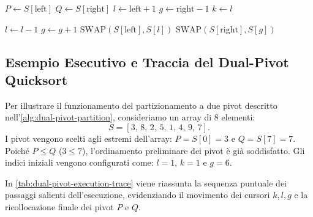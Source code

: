 \begin{algorithm}[H]
\caption{Dual-Pivot Partitioning (Yaroslavskiy)}
\label{alg:dual-pivot-partition}

$P \leftarrow S[\text{left}]$\;
$Q \leftarrow S[\text{right}]$\;
$l \leftarrow \text{left} + 1$\;
$g \leftarrow \text{right} - 1$\;
$k \leftarrow l$\;

$l \leftarrow l - 1$\;
$g \leftarrow g + 1$\;
$\text{SWAP}(S[\text{left}], S[l])$\;
$\text{SWAP}(S[\text{right}], S[g])$\;
\;
\end{algorithm}

\subsection{Esempio Esecutivo e Traccia del Dual-Pivot Quicksort}
\label{subsec:dual-pivot-trace-example}

Per illustrare il funzionamento del partizionamento a due pivot descritto nell'\autoref{alg:dual-pivot-partition}, consideriamo un array di 8 elementi:
\begin{equation}
  S = [3, \, 8, \, 2, \, 5, \, 1, \, 4, \, 9, \, 7].
\end{equation}
I pivot vengono scelti agli estremi dell'array: $P = S[0] = 3$ e $Q = S[7] = 7$. Poiché $P \le Q$ ($3 \le 7$), l'ordinamento preliminare dei pivot è già soddisfatto. Gli indici iniziali vengono configurati come: $l = 1$, $k = 1$ e $g = 6$.

In \autoref{tab:dual-pivot-execution-trace} viene riassunta la sequenza puntuale dei passaggi salienti dell'esecuzione, evidenziando il movimento dei cursori $k, l, g$ e la ricollocazione finale dei pivot $P$ e $Q$.

